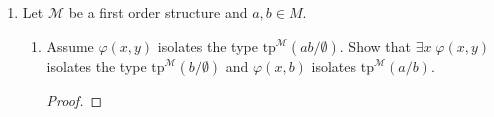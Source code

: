 \documentclass{article}
\begin{document}
\begin{enumerate}[label={\bf Q\arabic*:}]
\begin{proof}
      $\Leftarrow$: Assume $[p]=[q]$. By symmetry it suffices to show that
      $p\vdash q$. Let $\phi$ be a formula in $q$. We need to show that
      $p\vdash\phi$. Assume by contradiction that $p\not\vdash\phi$. Then
      $p\cup\{\neg\phi\}$ is consistent. Let $\mathcal{N}$ be an elementary
      extension of $\mathcal{M}$ that realizes $p\not\vdash\phi$; such
      $\mathcal{N}$ exists from Proposition 6.3. Let $p'\supseteq
      p\cup\{\neg\phi\}$ be the completion of $p\cup\{\neg\phi\}$ by
      including all formulas over $A$ in $n$-variables that are true in
      $\mathcal{N}$. Then $p'\in[q]$ since $p'\in[p]$ and $[p]=[q]$, yet
      $p'$ contains both $\phi$ and $\neg\phi$, contradicting the
      consistency of $p'$.
    \end{proof}

  \item Let $\mathcal{M}$ be a first order structure and $a,b\in M$.
    \begin{enumerate}
      \item Assume $\varphi(x,y)$ isolates the type
        $\text{tp}^{\mathcal{M}}(ab/\emptyset)$. Show that $\exists
        x\; \varphi(x,y)$ isolates the type
        $\text{tp}^{\mathcal{M}}(b/\emptyset)$ and $\varphi(x,b)$ isolates
        $\text{tp}^{\mathcal{M}}(a/b)$.

        \begin{proof}
        \end{proof}
    \end{enumerate}
\end{enumerate}
\end{document}
